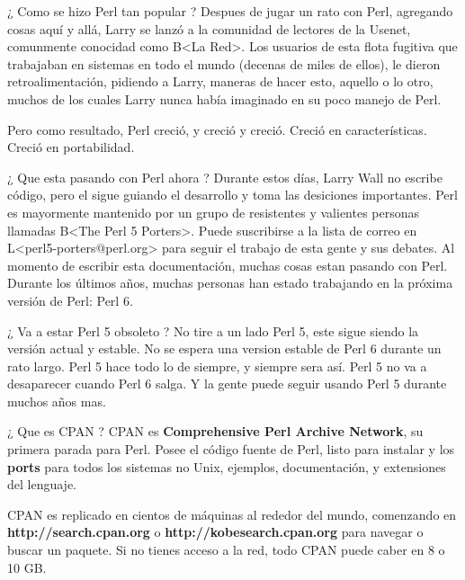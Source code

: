 \documentclass{beamer}
\begin{document}
\begin{frame}{¿ Como se hizo Perl tan popular ?} %
Despues de jugar un rato con Perl, agregando cosas aquí y allá, Larry se lanzó
a la comunidad de lectores de la Usenet,  comunmente conocidad como B<La Red>.
Los usuarios de esta flota fugitiva que trabajaban en sistemas en todo el
mundo (decenas de miles de ellos), le dieron retroalimentación, pidiendo a
Larry, maneras de hacer esto, aquello o lo otro, muchos de los cuales Larry
nunca había imaginado en su poco manejo de Perl. 

Pero como resultado, Perl creció, y creció y creció. Creció en características.
Creció en portabilidad. 

\end{frame}

\begin{frame}{¿ Que esta pasando con Perl ahora ? } %
Durante estos días, Larry Wall no escribe código, pero el sigue guiando el
desarrollo y toma las desiciones importantes. Perl es mayormente mantenido por
un grupo de resistentes y valientes personas llamadas B<The Perl 5 Porters>.
Puede suscribirse a la lista de correo en L<perl5-porters@perl.org> para seguir
el trabajo de esta gente y sus debates. Al momento de escribir esta
documentación,  muchas cosas estan pasando con Perl. Durante los últimos años,
muchas personas han estado trabajando en la próxima versión de Perl: Perl 6.
\end{frame}

\begin{frame}{¿ Va a estar Perl 5 obsoleto ?} %
No tire a un lado Perl 5, este sigue siendo la versión actual y estable. No se
espera una version estable de Perl 6 durante un rato largo. Perl 5 hace todo lo
de siempre, y siempre sera así. Perl 5 no va a desaparecer cuando Perl 6 salga.
Y la gente puede seguir usando Perl 5 durante muchos años mas. 
\end{frame}

\begin{frame}{¿ Que es CPAN ?} %
CPAN es {\bf Comprehensive Perl Archive Network}, su primera parada para Perl.
Posee el código fuente de Perl, listo para instalar y los {\bf ports} para 
todos los sistemas no Unix, ejemplos, documentación, y extensiones
del lenguaje. 

CPAN es replicado en cientos de máquinas al rededor del mundo, comenzando en
{\bf http://search.cpan.org} o {\bf http://kobesearch.cpan.org} para navegar 
o buscar un paquete. Si no tienes acceso a la red, todo CPAN puede caber 
en 8 o 10 GB.

\end{frame}
\end{document}
